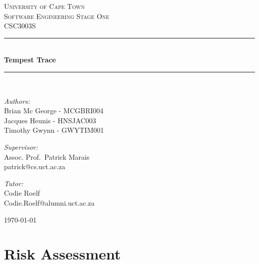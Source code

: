\documentclass[a4paper,10pt]{article}
\begin{document}
	\begin{titlepage} \begin{center}
		\textsc{\LARGE University of Cape Town}
		\\[1.5cm] \textsc{\Large Software Engineering Stage One\\CSC3003S}
		\\[0.5cm]
		\noindent\rule[0.4mm]{\textwidth}{0.1mm}
		\\[0.4cm] { \huge \bfseries Tempest Trace \\[0.4cm] }
		\noindent\rule[0.4mm]{\textwidth}{0.1mm}
		\\[1cm]
		\begin{minipage}[t]{0.4\textwidth}
			\begin{flushleft}\large \emph{Authors:}\\ Brian Mc George - MCGBRI004 \\ Jacques Heunis - HNSJAC003 \\ Timothy Gwynn - GWYTIM001\end{flushleft}
			\end{minipage} \begin{minipage}[t]{0.4\textwidth}
			\begin{flushright} \large \emph{Supervisor:} \\ Assoc. Prof.~Patrick Marais\\patrick@cs.uct.ac.za\end{flushright}
				\begin{flushright} \large \emph{Tutor:} \\ Codie Roelf\\Codie.Roelf@alumni.uct.ac.za\end{flushright}
				\end{minipage} \vfill {\large \today}
			\end{center}
		\end{titlepage}
		\newpage
		\tableofcontents
		\newpage

		\section{Risk Assessment}
\end{document}
